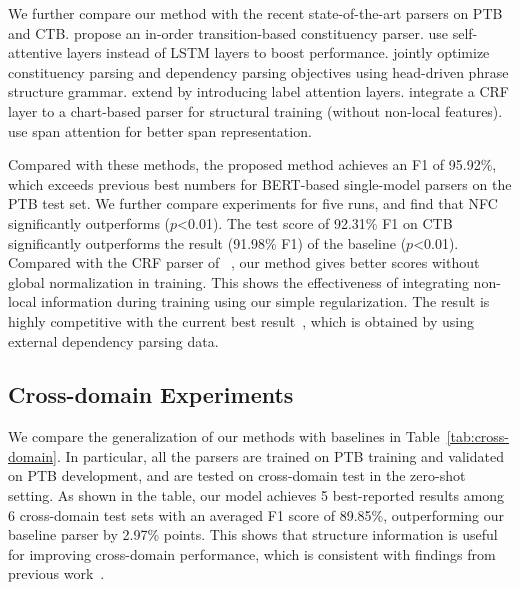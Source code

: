 \documentclass[11pt]{article}
\begin{document}
We further compare our method with the recent state-of-the-art parsers on PTB and CTB. 
\citet{liu-zhang-2017-order} propose an in-order transition-based constituency parser. 
\citet{san-constituency} use self-attentive layers instead of LSTM layers to boost performance. 
\citet{head-driven} jointly optimize constituency parsing and dependency parsing objectives using head-driven phrase structure grammar. 
\citet{label-attention-parsing} extend \citet{head-driven} by introducing label attention layers.
\citet{constituency-crf} integrate a CRF layer to a chart-based parser for structural training (without non-local features). 
\citet{span-attention} use span attention for better span representation.



Compared with these methods, the proposed method achieves an F1 of 95.92\%, which exceeds previous best numbers for BERT-based single-model parsers on the PTB test set. We further compare  experiments for five runs, and find that NFC significantly outperforms \citet{san-constituency} ($p$\textless0.01).
The test score of 92.31\% F1 on CTB significantly outperforms the result (91.98\% F1) of the baseline ($p$\textless0.01).
Compared with the CRF parser of ~\citet{constituency-crf}, our method gives better scores without global normalization in training. 
This shows the effectiveness of integrating non-local information during training using our simple regularization. 
The result is highly competitive with the current best result~\cite{label-attention-parsing}, which is obtained by using external dependency parsing data. 


\subsection{Cross-domain Experiments}

We compare the generalization of our methods with baselines in Table~\ref{tab:cross-domain}. 
In particular, all the parsers are trained on PTB training and validated on PTB development, and are tested on cross-domain test in the zero-shot setting. 
As shown in the table, our model achieves 5 best-reported results among 6 cross-domain test sets with an averaged F1 score of 89.85\%, outperforming our baseline parser by 2.97\% points. 
This shows that structure information is useful for improving cross-domain performance, which is consistent with findings from previous work~\cite{cross-domain-parser}.
\end{document}
